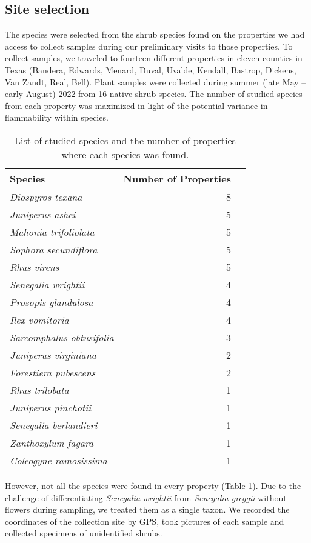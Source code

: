 \documentclass{bmcart}
\begin{document}
\subsection*{Site selection}
The species were selected from the shrub species found on the properties we had access to collect samples during our preliminary visits to those properties.  To collect samples, we traveled to fourteen different properties in eleven counties in Texas (Bandera, Edwards, Menard, Duval, Uvalde, Kendall, Bastrop, Dickens, Van Zandt, Real, Bell).   
Plant samples were collected during summer (late May -- early August) 2022 from 16 native shrub species. The number of studied species from each property was maximized in light of the potential variance in flammability within species. 
\begin{table}
    \centering
    \caption{List of studied species and the number of properties where each species was found.}
    \label{tab:species_table}
    \begin{tabular}{lrr}
    \hline
    \textbf{Species} & \textbf{Number of Properties}\\
    \hline
    \emph{Diospyros texana} & 8 \\
    \emph{Juniperus ashei}    & 5\\
    \emph{Mahonia trifoliolata} & 5\\
    \emph{Sophora secundiflora} & 5\\
    \emph{Rhus virens} & 5 \\
    \emph{Senegalia wrightii} & 4\\
    \emph{Prosopis glandulosa} & 4\\
    \emph{Ilex vomitoria } & 4 \\
    \emph{Sarcomphalus obtusifolia} & 3\\
    \emph{Juniperus virginiana} & 2\\
    \emph{Forestiera pubescens} & 2\\
    \emph{Rhus trilobata} & 1\\
    \emph{Juniperus pinchotii} & 1\\
    \emph{Senegalia berlandieri} & 1\\
    \emph{Zanthoxylum fagara} & 1\\
    \emph{Coleogyne ramosissima} & 1\\
    \end{tabular}
    
\end{table}
However, not all the species were found in every property (Table \ref{tab:species_table}). Due to the challenge of differentiating \emph{Senegalia wrightii} from \emph{Senegalia greggii} without flowers during sampling, we treated them as a single taxon. We recorded the coordinates of the collection site by GPS, took pictures of each sample  and collected specimens of unidentified shrubs.
\end{document}
